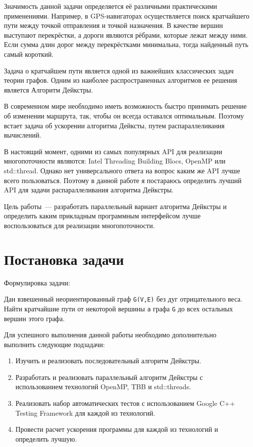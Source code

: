 \documentclass{article}
\begin{document}
\par Значимость данной задачи определяется её различными практическими применениями. Например, в GPS-навигаторах осуществляется поиск кратчайшего пути между точкой отправления и точкой назначения. В качестве вершин выступают перекрёстки, а дороги являются рёбрами, которые лежат между ними. Если сумма длин дорог между перекрёстками минимальна, тогда найденный путь самый короткий.

\par Задача о кратчайшем пути является одной из важнейших классических задач теории графов. Одним из наиболее распространенных алгоритмов ее решения является Алгоритм Дейкстры.

\par В современном мире необходимо иметь возможность быстро принимать решение об изменении маршрута, так, чтобы он всегда оставался оптимальным. Поэтому встает задача об ускорении алгоритма Дейксты, путем распараллеливания вычислений.

\par В настоящий момент, одними из самых популярных API для реализации многопоточности являются: Intel Threading Building Blocs, OpenMP или std::thread. Однако нет универсального ответа на вопрос каким же API лучше всего пользоваться. Поэтому в данной работе я постараюсь определить лучший API для задачи распараллеливания алгоритма Дейкстры.

\par Цель работы~--- разработать параллельный вариант алгоритма Дейкстры и определить каким прикладным программным интерфейсом  лучше воспользоваться для реализации многопоточности.

\newpage

\section{Постановка задачи}
Формулировка задачи: 
\par Дан взвешенный неориентированный граф \verb|G(V,E)| без дуг отрицательного веса. Найти кратчайшие пути от некоторой вершины \verb|a| графа \verb|G| до всех остальных вершин этого графа.

\par Для успешного выполнения данной работы необходимо дополнительно выполнить следующие подзадачи:
 
\begin{enumerate}
\item Изучить и реализовать последовательный алгоритм Дейкстры.
\item Разработать и реализовать параллельный алгоритм Дейкстры с использованием технологий OpenMP, TBB и std::threads.
\item Реализовать набор автоматических тестов с использованием Google C++ Testing Framework для каждой из технологий.
\item Провести расчет ускорения программы для каждой из технологий и определить лучшую. 
\end{enumerate}
\end{document}
